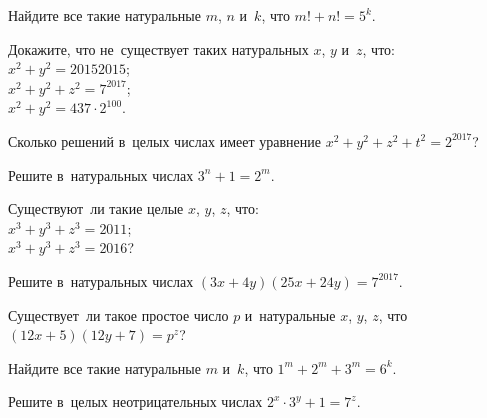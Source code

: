


\begin{problems}

\item
Найдите все такие натуральные $m$, $n$ и~$k$, что $m! + n! = 5^{k}$.

\item
Докажите, что не~существует таких натуральных $x$, $y$ и~$z$, что:
\\
\subproblem $x^2 + y^2 = 20152015$;
\\
\subproblem $x^2 + y^2 + z^2 = 7^{2017}$;
\\
\subproblem $x^2 + y^2 = 437 \cdot 2^{100}$.

\item
Сколько решений в~целых числах имеет уравнение
$x^2 + y^2 + z^2 + t^2 = 2^{2017}$?

\item
Решите в~натуральных числах $3^{n} + 1 = 2^{m}$.

\item
Существуют~ли такие целые $x$, $y$, $z$, что:
\\
\subproblem $x^3 + y^3 + z^3 = 2011$;
\\
\subproblem $x^3 + y^3 + z^3 = 2016$?


\item
Решите в~натуральных числах $(3 x + 4 y) (25 x + 24 y) = 7^{2017}$.

\item
Существует~ли такое простое число $p$ и~натуральные $x$, $y$, $z$, что
$(12 x + 5) (12 y + 7) = p^{z}$?

\item
Найдите все такие натуральные $m$ и~$k$, что $1^{m} + 2^{m} + 3^{m} = 6^{k}$.

\item
Решите в~целых неотрицательных числах $2^{x} \cdot 3^{y} + 1 = 7^{z}$.


\end{problems}

